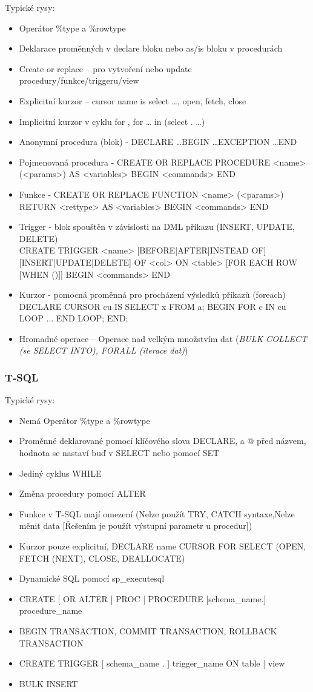 Typické rysy:
\begin{itemize}
\item Operátor \%type a \%rowtype
\item Deklarace proměnných v declare bloku nebo as/is bloku v procedurách
\item Create or replace – pro vytvoření nebo update procedury/funkce/triggeru/view
\item Explicitní kurzor – cursor name is select \ldots, open, fetch, close
\item Implicitní kurzor v cyklu for , for … in (select . …)
\item Anonymní procedura (blok) - DECLARE \ldots BEGIN \ldots EXCEPTION \ldots END
\item Pojmenovaná procedura - CREATE OR REPLACE PROCEDURE <name> (<params>) AS <variables> BEGIN <commands> END
\item Funkce - CREATE OR REPLACE FUNCTION <name> (<params>) RETURN <rettype> AS <variables> BEGIN <commands> END
\item Trigger - blok spouštěn v závislosti na DML příkazu (INSERT, UPDATE, DELETE) \\
CREATE TRIGGER <name> [BEFORE|AFTER|INSTEAD OF] [INSERT|UPDATE|DELETE] OF <col> ON <table> [FOR EACH ROW [WHEN ()]] BEGIN <commands> END
\item Kurzor - pomocná proměnná pro procházení výsledků příkazů (foreach)\\
DECLARE CURSOR cu IS SELECT x FROM a; BEGIN FOR c IN cu LOOP ... END LOOP; END;
\item Hromadné operace – Operace nad velkým množstvím dat (\textit{BULK COLLECT (se SELECT INTO), FORALL (iterace dat)})
\end{itemize}

\subsubsection{T-SQL}
Typické rysy:
\begin{itemize}
\item Nemá Operátor \%type a \%rowtype
\item Proměnné deklarované pomocí klíčového slova DECLARE, a @ před názvem, hodnota se nastaví buď v SELECT nebo pomocí SET
\item Jediný cyklus WHILE
\item Změna procedury pomocí ALTER
\item Funkce v T-SQL mají omezení (Nelze použít TRY, CATCH syntaxe,Nelze měnit data [Řešením je použít výstupní parametr u procedur])
\item Kurzor pouze explicitní, DECLARE name CURSOR FOR SELECT (OPEN, FETCH (NEXT), CLOSE, DEALLOCATE)
\item Dynamické SQL pomocí sp\_executesql
\item CREATE [ OR ALTER ] { PROC | PROCEDURE } [schema\_name.] procedure\_name 
\item BEGIN TRANSACTION, COMMIT TRANSACTION, ROLLBACK TRANSACTION
\item CREATE TRIGGER [ schema\_name . ] trigger\_name ON { table | view }
\item BULK INSERT 

\end{itemize}

